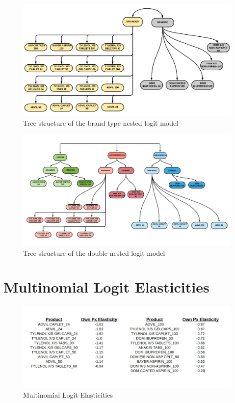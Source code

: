 \documentclass[12pt, authoryear]{elsarticle}
\begin{document}
\begin{figure}[H]
	\centering
	\includegraphics[clip, angle=0, width=1\textwidth]{FIG3.pdf}
	\caption{Tree structure of the brand type nested logit model}\label{app_brand_tree}
\end{figure}

\begin{figure}[H]
	\centering
	\includegraphics[clip, angle=0, width=1\textwidth]{FIG2.pdf}
	\caption{Tree structure of the double nested logit model}\label{app_double_tree}
\end{figure}

\section{Multinomial Logit Elasticities}  \label{app1}

\begin{figure}[H]
	\centering
	\includegraphics[clip, angle=0, width=1\textwidth]{own_p_elas}
	\caption{Multinomial Logit Elasticities }\label{elas0}
\end{figure}
\end{document}
